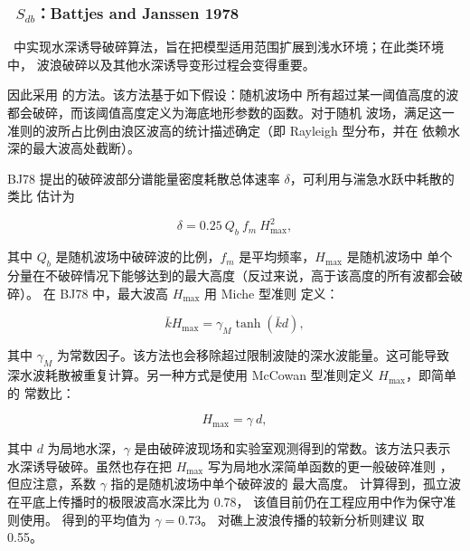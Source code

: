 \vsssub
\subsubsection{~$S_{db}$：Battjes and  Janssen 1978} \label{sec:DB1}
\vsssub


\noindent
\ws\ 中实现水深诱导破碎算法，旨在把模型适用范围扩展到浅水环境；在此类环境中，
波浪破碎以及其他水深诱导变形过程会变得重要。

因此采用 \citet[][下文记为 BJ78]{pro:BJ78} 的方法。该方法基于如下假设：随机波场中
所有超过某一阈值高度的波都会破碎，而该阈值高度定义为海底地形参数的函数。对于随机
波场，满足这一准则的波所占比例由浪区波高的统计描述确定（即 Rayleigh 型分布，并在
依赖水深的最大波高处截断）。

BJ78 提出的破碎波部分谱能量密度耗散总体速率 $\delta$，可利用与湍急水跃中耗散的类比
估计为


\begin{equation}
\delta = 0.25 \: Q_b \: f_m \: H_{\max}^2  , \label{eq:BJ78_base}
\end{equation}

\noindent
其中 $Q_b$ 是随机波场中破碎波的比例，$f_m$ 是平均频率，$H_{\max}$ 是随机波场中
单个分量在不破碎情况下能够达到的最大高度（反过来说，高于该高度的所有波都会破碎）。
在 BJ78 中，最大波高 $H_{\max}$ 用 Miche 型准则 \citep{art:Miche44} 定义：


\begin{equation}
\bar{k} H_{\max} = \gamma_M \tanh ( \bar{k} d )
 , \label{eq:BJ78_Miche}
\end{equation}

\noindent
其中 $\gamma_M$ 为常数因子。该方法也会移除超过限制波陡的深水波能量。这可能导致
深水波耗散被重复计算。另一种方式是使用 McCowan 型准则定义 $H_{\max}$，即简单的
常数比：


\begin{equation}
H_{\max} = \gamma \: d  , \label{eq:BJ78_McC}
\end{equation}

\noindent
其中 $d$ 为局地水深，$\gamma$ 是由破碎波现场和实验室观测得到的常数。该方法只表示
水深诱导破碎。虽然也存在把 $H_{\max}$ 写为局地水深简单函数的更一般破碎准则
\citep[e.g.,][]{art:TG83}，但应注意，系数 $\gamma$ 指的是随机波场中单个破碎波的
最大高度。\cite{art:M1894} 计算得到，孤立波在平底上传播时的极限波高水深比为 0.78，
该值目前仍在工程应用中作为保守准则使用。\cite{pro:BJ78} 得到的平均值为
$\gamma = 0.73$。\cite{art:Nel94, art:Nel97} 对礁上波浪传播的较新分析则建议
取 0.55。

